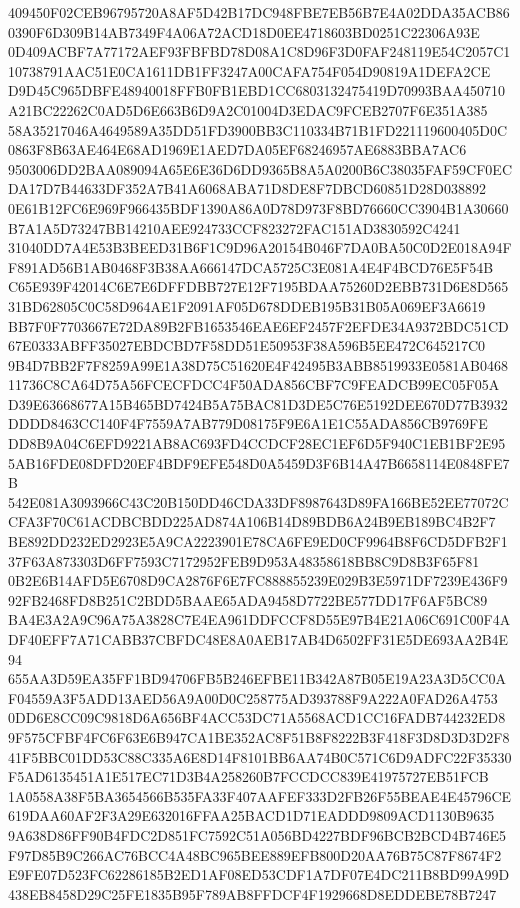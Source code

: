 \documentclass[UTF8,fontset=fandol,zihao=-4,a4paper]{ctexart}
\begin{document}
{{409450F02CEB96795720A8AF5D42B17DC948FBE7EB56B7E4A02DDA35ACB860390F6D309B14AB7349F4A06A72ACD18D0EE4718603BD0251C22306A93E
0D409ACBF7A77172AEF93FBFBD78D08A1C8D96F3D0FAF248119E54C2057C110738791AAC51E0CA1611DB1FF3247A00CAFA754F054D90819A1DEFA2CE
D9D45C965DBFE48940018FFB0FB1EBD1CC6803132475419D70993BAA450710A21BC22262C0AD5D6E663B6D9A2C01004D3EDAC9FCEB2707F6E351A385
58A35217046A4649589A35DD51FD3900BB3C110334B71B1FD221119600405D0C0863F8B63AE464E68AD1969E1AED7DA05EF68246957AE6883BBA7AC6
9503006DD2BAA089094A65E6E36D6DD9365B8A5A0200B6C38035FAF59CF0ECDA17D7B44633DF352A7B41A6068ABA71D8DE8F7DBCD60851D28D038892
0E61B12FC6E969F966435BDF1390A86A0D78D973F8BD76660CC3904B1A30660B7A1A5D73247BB14210AEE924733CCF823272FAC151AD3830592C4241
31040DD7A4E53B3BEED31B6F1C9D96A20154B046F7DA0BA50C0D2E018A94FF891AD56B1AB0468F3B38AA666147DCA5725C3E081A4E4F4BCD76E5F54B
C65E939F42014C6E7E6DFFDBB727E12F7195BDAA75260D2EBB731D6E8D56531BD62805C0C58D964AE1F2091AF05D678DDEB195B31B05A069EF3A6619
BB7F0F7703667E72DA89B2FB1653546EAE6EF2457F2EFDE34A9372BDC51CD67E0333ABFF35027EBDCBD7F58DD51E50953F38A596B5EE472C645217C0
9B4D7BB2F7F8259A99E1A38D75C51620E4F42495B3ABB8519933E0581AB046811736C8CA64D75A56FCECFDCC4F50ADA856CBF7C9FEADCB99EC05F05A
D39E63668677A15B465BD7424B5A75BAC81D3DE5C76E5192DEE670D77B3932DDDD8463CC140F4F7559A7AB779D08175F9E6A1E1C55ADA856CB9769FE
DD8B9A04C6EFD9221AB8AC693FD4CCDCF28EC1EF6D5F940C1EB1BF2E955AB16FDE08DFD20EF4BDF9EFE548D0A5459D3F6B14A47B6658114E0848FE7B
542E081A3093966C43C20B150DD46CDA33DF8987643D89FA166BE52EE77072CCFA3F70C61ACDBCBDD225AD874A106B14D89BDB6A24B9EB189BC4B2F7
BE892DD232ED2923E5A9CA2223901E78CA6FE9ED0CF9964B8F6CD5DFB2F137F63A873303D6FF7593C7172952FEB9D953A48358618BB8C9D8B3F65F81
0B2E6B14AFD5E6708D9CA2876F6E7FC888855239E029B3E5971DF7239E436F992FB2468FD8B251C2BDD5BAAE65ADA9458D7722BE577DD17F6AF5BC89
BA4E3A2A9C96A75A3828C7E4EA961DDFCCF8D55E97B4E21A06C691C00F4ADF40EFF7A71CABB37CBFDC48E8A0AEB17AB4D6502FF31E5DE693AA2B4E94
655AA3D59EA35FF1BD94706FB5B246EFBE11B342A87B05E19A23A3D5CC0AF04559A3F5ADD13AED56A9A00D0C258775AD393788F9A222A0FAD26A4753
0DD6E8CC09C9818D6A656BF4ACC53DC71A5568ACD1CC16FADB744232ED89F575CFBF4FC6F63E6B947CA1BE352AC8F51B8F8222B3F418F3D8D3D3D2F8
41F5BBC01DD53C88C335A6E8D14F8101BB6AA74B0C571C6D9ADFC22F35330F5AD6135451A1E517EC71D3B4A258260B7FCCDCC839E41975727EB51FCB
1A0558A38F5BA3654566B535FA33F407AAFEF333D2FB26F55BEAE4E45796CE619DAA60AF2F3A29E632016FFAA25BACD1D71EADDD9809ACD1130B9635
9A638D86FF90B4FDC2D851FC7592C51A056BD4227BDF96BCB2BCD4B746E5F97D85B9C266AC76BCC4A48BC965BEE889EFB800D20AA76B75C87F8674F2
E9FE07D523FC62286185B2ED1AF08ED53CDF1A7DF07E4DC211B8BD99A99D438EB8458D29C25FE1835B95F789AB8FFDCF4F1929668D8EDDEBE78B7247
}}
\end{document}
